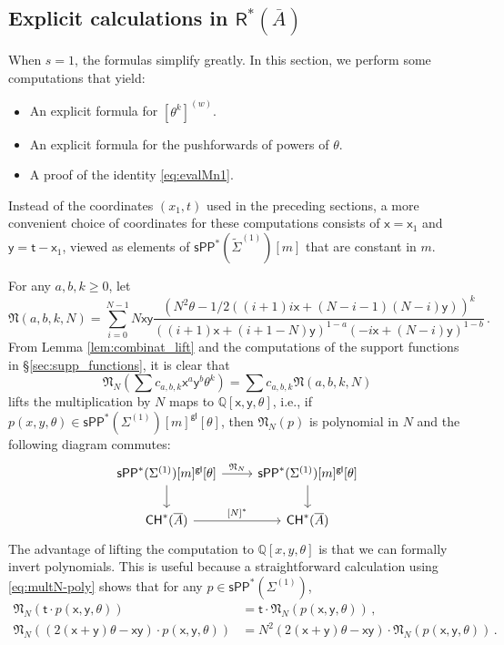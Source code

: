 \documentclass[11pt]{article}
\def\CH{\mathsf{CH}}
\def\R{\mathsf{R}}
\newcommand{\barA}{\overline{A}}
\newcommand{\sPP}{\mathsf{sPP}}
\newcommand{\spp}{\sPP}
\theoremstyle{definition}
\begin{document}
\subsection{Explicit calculations in \texorpdfstring{$\R^*(\barA)$}{R(A)}}\label{sec:expl_calc}

When $s=1$, the formulas simplify greatly. In this section, we perform some computations that yield:
\begin{itemize}
    \item An explicit formula for $[\theta^k]^{(w)}$.
    \item An explicit formula for the pushforwards of powers of $\theta$.
    \item A proof of the identity \eqref{eq:evalMn1}.
\end{itemize}
Instead of the coordinates $(x_1,t)$ used in the preceding sections, a more convenient choice of coordinates
for these computations consists of $\mathsf{x}=\mathsf{x}_1$ and $\mathsf{y}=\mathsf{t}-\mathsf{x}_1$, viewed as elements of $\spp^{\ast}(\tilde{\Sigma}^{(1)})[m]$ that are constant in $m$.

For any $a, b, k \geq 0$, let
$$
\mathfrak N(a,b,k, N)=\sum_{i=0}^{N-1}N\mathsf{x}\mathsf{y}\frac{(N^2\theta-1/2((i+1)i\mathsf{x}+(N-i-1)(N-i)\mathsf{y}))^k}{((i+1)\mathsf{x}+(i+1-N)\mathsf{y})^{1-a}(-i\mathsf{x}+(N-i)\mathsf{y})^{1-b}}\,.
$$
From Lemma \ref{lem:combinat_lift} and the computations of the support functions in \S\ref{sec:supp_functions}, it is clear that
\begin{equation}\label{eq:multN-poly}
\mathfrak N_N(\sum c_{a,b,k}\mathsf{x}^a\mathsf{y}^b\theta^k) = \sum c_{a,b,k}\mathfrak N(a,b,k,N)
\end{equation}
lifts the multiplication by $N$ maps to $\mathbb{Q}[\mathsf{x},\mathsf{y},\theta]$, i.e., if $p(x,y,\theta)\in \spp^{\ast}(\Sigma^{(1)})[m]^{\mathsf{gl}}[\theta]$,
then $\mathfrak N_N(p)$ is polynomial in $N$ and the following diagram commutes:
$$
\begin{tikzcd}
	{\spp^{\ast}(\Sigma^{(1)})[m]^{\mathsf{gl}}[\theta]} & {\spp^{\ast}(\Sigma^{(1)})[m]^{\mathsf{gl}}[\theta]} \\
	{\CH^*(\barA)} & {\CH^*(\barA)}
	\arrow["{\mathfrak N_N}", from=1-1, to=1-2]
	\arrow[from=1-1, to=2-1]
	\arrow[from=1-2, to=2-2]
	\arrow["{[N]^*}", from=2-1, to=2-2]
\end{tikzcd}
$$
The advantage of lifting the computation to $\mathbb{Q}[x,y,\theta]$ is that we can formally invert polynomials. This is useful because a straightforward calculation using \eqref{eq:multN-poly} shows that for any $p \in \spp^{\ast}(\Sigma^{(1)})$,
\begin{align*}
\mathfrak N_N(\mathsf{t} \cdot p(\mathsf{x},\mathsf{y},\theta) ) &= \mathsf{t}\cdot\mathfrak N_N(p(\mathsf{x},\mathsf{y},\theta))\,,\\
\mathfrak N_N((2(\mathsf{x}+\mathsf{y})\theta-\mathsf{x}\mathsf{y})\cdot p(\mathsf{x},\mathsf{y},\theta)) &= N^2( 2(\mathsf{x}+\mathsf{y})\theta-\mathsf{x}\mathsf{y}) \cdot \mathfrak N_N(p(\mathsf{x},\mathsf{y},\theta))\,.
\end{align*}
\end{document}
